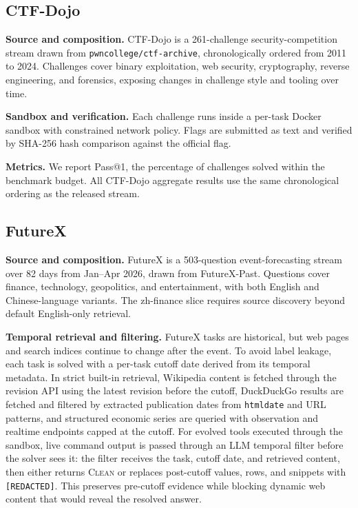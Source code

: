 \subsection{CTF-Dojo}

\noindent\textbf{Source and composition.}
CTF-Dojo is a 261-challenge security-competition stream drawn from \texttt{pwncollege/ctf-archive}, chronologically ordered from 2011 to 2024. Challenges cover binary exploitation, web security, cryptography, reverse engineering, and forensics, exposing changes in challenge style and tooling over time.

\noindent\textbf{Sandbox and verification.}
Each challenge runs inside a per-task Docker sandbox with constrained network policy. Flags are submitted as text and verified by SHA-256 hash comparison against the official flag.

\noindent\textbf{Metrics.}
We report Pass@1, the percentage of challenges solved within the benchmark budget. All CTF-Dojo aggregate results use the same chronological ordering as the released stream.

\subsection{FutureX}

\noindent\textbf{Source and composition.}
FutureX is a 503-question event-forecasting stream over 82 days from Jan--Apr 2026, drawn from FutureX-Past. Questions cover finance, technology, geopolitics, and entertainment, with both English and Chinese-language variants. The zh-finance slice requires source discovery beyond default English-only retrieval.

\noindent\textbf{Temporal retrieval and filtering.}
FutureX tasks are historical, but web pages and search indices continue to change after the event. To avoid label leakage, each task is solved with a per-task cutoff date derived from its temporal metadata. In strict built-in retrieval, Wikipedia content is fetched through the revision API using the latest revision before the cutoff, DuckDuckGo results are fetched and filtered by extracted publication dates from \texttt{htmldate} and URL patterns, and structured economic series are queried with observation and realtime endpoints capped at the cutoff. For evolved tools executed through the sandbox, live command output is passed through an LLM temporal filter before the solver sees it: the filter receives the task, cutoff date, and retrieved content, then either returns \textsc{Clean} or replaces post-cutoff values, rows, and snippets with \texttt{[REDACTED]}. This preserves pre-cutoff evidence while blocking dynamic web content that would reveal the resolved answer.


